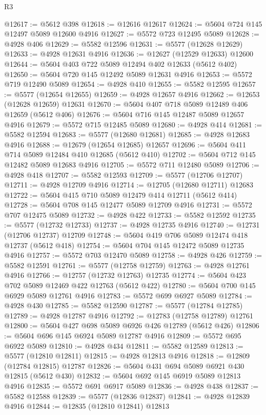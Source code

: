 \begin{lexlean}{R3}
\begin{coremodule}
@12617 := @5612 @398
@12618 := @12616 @12617
@12624 := @5604 @724 @145 @12497 @5089 @12600 @4916
@12627 := @5572 @723 @12495 @5089
@12628 := @4928 @406
@12629 := @5582 @12596
@12631 := @5577 (@12628 @12629)
@12633 := @4928 @12631 @4916
@12636 := @12627 (@12529 @12633) @12600
@12644 := @5604 @403 @722 @5089 @12494 @402 @12633 (@5612 @402)
@12650 := @5604 @720 @145 @12492 @5089 @12631 @4916
@12653 := @5572 @719 @12490 @5089
@12654 := @4928 @410
@12655 := @5582 @12595
@12657 := @5577 (@12654 @12655)
@12659 := @4928 @12657 @4916
@12662 := @12653 (@12628 @12659) @12631
@12670 := @5604 @407 @718 @5089 @12489 @406 @12659 (@5612 @406)
@12676 := @5604 @716 @145 @12487 @5089 @12657 @4916
@12679 := @5572 @715 @12485 @5089
@12680 := @4928 @414
@12681 := @5582 @12594
@12683 := @5577 (@12680 @12681)
@12685 := @4928 @12683 @4916
@12688 := @12679 (@12654 @12685) @12657
@12696 := @5604 @411 @714 @5089 @12484 @410 @12685 (@5612 @410)
@12702 := @5604 @712 @145 @12482 @5089 @12683 @4916
@12705 := @5572 @711 @12480 @5089
@12706 := @4928 @418
@12707 := @5582 @12593
@12709 := @5577 (@12706 @12707)
@12711 := @4928 @12709 @4916
@12714 := @12705 (@12680 @12711) @12683
@12722 := @5604 @415 @710 @5089 @12479 @414 @12711 (@5612 @414)
@12728 := @5604 @708 @145 @12477 @5089 @12709 @4916
@12731 := @5572 @707 @12475 @5089
@12732 := @4928 @422
@12733 := @5582 @12592
@12735 := @5577 (@12732 @12733)
@12737 := @4928 @12735 @4916
@12740 := @12731 (@12706 @12737) @12709
@12748 := @5604 @419 @706 @5089 @12474 @418 @12737 (@5612 @418)
@12754 := @5604 @704 @145 @12472 @5089 @12735 @4916
@12757 := @5572 @703 @12470 @5089
@12758 := @4928 @426
@12759 := @5582 @12591
@12761 := @5577 (@12758 @12759)
@12763 := @4928 @12761 @4916
@12766 := @12757 (@12732 @12763) @12735
@12774 := @5604 @423 @702 @5089 @12469 @422 @12763 (@5612 @422)
@12780 := @5604 @700 @145 @6929 @5089 @12761 @4916
@12783 := @5572 @699 @6927 @5089
@12784 := @4928 @430
@12785 := @5582 @12590
@12787 := @5577 (@12784 @12785)
@12789 := @4928 @12787 @4916
@12792 := @12783 (@12758 @12789) @12761
@12800 := @5604 @427 @698 @5089 @6926 @426 @12789 (@5612 @426)
@12806 := @5604 @696 @145 @6924 @5089 @12787 @4916
@12809 := @5572 @695 @6922 @5089
@12810 := @4928 @434
@12811 := @5582 @12589
@12813 := @5577 (@12810 @12811)
@12815 := @4928 @12813 @4916
@12818 := @12809 (@12784 @12815) @12787
@12826 := @5604 @431 @694 @5089 @6921 @430 @12815 (@5612 @430)
@12832 := @5604 @692 @145 @6919 @5089 @12813 @4916
@12835 := @5572 @691 @6917 @5089
@12836 := @4928 @438
@12837 := @5582 @12588
@12839 := @5577 (@12836 @12837)
@12841 := @4928 @12839 @4916
@12844 := @12835 (@12810 @12841) @12813

\end{coremodule}
\end{lexlean}
